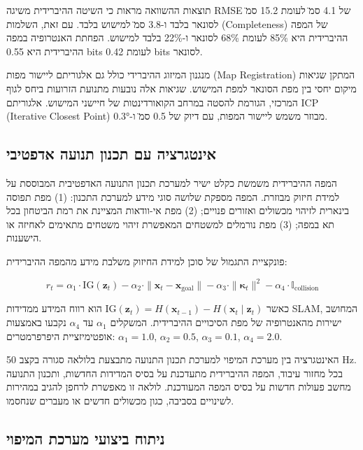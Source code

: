 תוצאות ההשוואה מראות כי השיטה ההיברידית משיגה RMSE של 4.1 ס\"מ לעומת 15.2 ס\"מ לסונאר בלבד ו-3.8 ס\"מ למישוש בלבד. עם זאת, השלמות (Completeness) של המפה ההיברידית היא 85\% לעומת 68\% לסונאר ו-22\% בלבד למישוש. הפחתת האנטרופיה במפה ההיברידית היא 0.55 bits לעומת 0.42 bits לסונאר.

מנגנון המיזוג ההיברידי כולל גם אלגוריתם ליישור מפות (Map Registration) המתקן שגיאות מיקום יחסי בין מפת הסונאר למפת המישוש. שגיאות אלה נובעות מתנועת הזרועות ביחס לגוף המרכזי, הגורמת להסטה במרחב הקואורדינטות של חיישני המישוש. אלגוריתם ICP (Iterative Closest Point) מבוזר משמש ליישור המפות, עם דיוק של 0.5 ס\"מ ו-0.3°.

\subsection{אינטגרציה עם תכנון תנועה אדפטיבי}
\label{sec:ch07_integration}

המפה ההיברידית משמשת כקלט ישיר למערכת תכנון התנועה האדפטיבית המבוססת על למידת חיזוק מבוזרת. המפה מספקת שלושה סוגי מידע למערכת התכנון: (1) מפת תפוסה בינארית לזיהוי מכשולים ואזורים פנויים; (2) מפת אי-וודאות המציינת את רמת הביטחון בכל תא במפה; (3) מפת נורמלים למשטחים המאפשרת זיהוי משטחים מתאימים לאחיזה או הישענות.

פונקציית התגמול של סוכן למידת החיזוק משלבת מידע מהמפה ההיברידית:

\begin{equation}
r_t = \alpha_1 \cdot \text{IG}(\mathbf{z}_t) - \alpha_2 \cdot \|\mathbf{x}_t - \mathbf{x}_{\text{goal}}\| - \alpha_3 \cdot \|\boldsymbol{\kappa}_t\|^2 - \alpha_4 \cdot \mathbb{I}_{\text{collision}}
\label{eq:ch07_reward}
\end{equation}

כאשר $\text{IG}(\mathbf{z}_t) = H(\mathbf{x}_{t-1}) - H(\mathbf{x}_t \mid \mathbf{z}_t)$ הוא רווח המידע ממדידות SLAM, המחושב ישירות מהאנטרופיה של מפת הסיכויים ההיברידית. המשקלים $\alpha_1$ עד $\alpha_4$ נקבעו באמצעות אופטימיזציית היפרפרמטרים: $\alpha_1 = 1.0$, $\alpha_2 = 0.5$, $\alpha_3 = 0.1$, $\alpha_4 = 2.0$.

האינטגרציה בין מערכת המיפוי למערכת תכנון התנועה מתבצעת בלולאה סגורה בקצב 50 Hz. בכל מחזור עיבוד, המפה ההיברידית מתעדכנת על בסיס המדידות החדשות, ותכנון התנועה מחשב פעולות חדשות על בסיס המפה המעודכנת. לולאה זו מאפשרת לרחפן להגיב במהירות לשינויים בסביבה, כגון מכשולים חדשים או מעברים שנחסמו.

\subsection{ניתוח ביצועי מערכת המיפוי}
\label{sec:ch07_performance}

